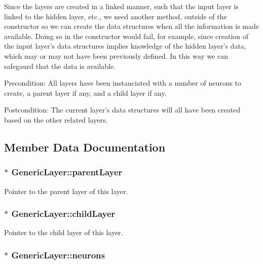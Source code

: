 Since the layers are created in a linked manner, such that the input layer is linked to the hidden layer, etc., we need another method, outside of the constructor so we can create the data structures when all the information is made available. Doing so in the constructor would fail, for example, since creation of the input layer's data structures implies knowledge of the hidden layer's data, which may or may not have been previously defined. In this way we can safegaurd that the data is available.

\begin{Desc}
\item[Precondition:]All layers have been instanciated with a number of neurons to create, a parent layer if any, and a child layer if any. \end{Desc}
\begin{Desc}
\item[Postcondition:]The current layer's data structures will all have been created based on the other related layers. \end{Desc}


\subsection{Member Data Documentation}
\hypertarget{classGenericLayer_f936bd9ef0690287bf7ce9fdddaec09d}{
\subsubsection{$\ast$ {\bf GenericLayer::parentLayer}}}
\label{classGenericLayer_f936bd9ef0690287bf7ce9fdddaec09d}


Pointer to the parent layer of this layer. \hypertarget{classGenericLayer_1eb75b8a4e3951ae983f801bb1d8c478}{
\subsubsection{$\ast$ {\bf GenericLayer::childLayer}}}
\label{classGenericLayer_1eb75b8a4e3951ae983f801bb1d8c478}


Pointer to the child layer of this layer. \hypertarget{classGenericLayer_2464f709af50f9def120c1978ed68f24}{
\subsubsection{$\ast$ {\bf GenericLayer::neurons}}}
\label{classGenericLayer_2464f709af50f9def120c1978ed68f24}


